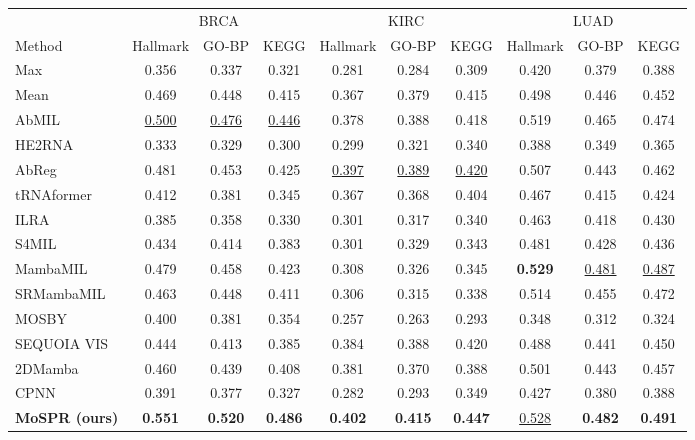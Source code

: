 \begin{tabular}{lccccccccc}
\toprule
& \multicolumn{3}{c}{BRCA} & \multicolumn{3}{c}{KIRC} & \multicolumn{3}{c}{LUAD}\\
\cmidrule(lr){2-4}\cmidrule(lr){5-7}\cmidrule(lr){8-10}
Method & Hallmark & GO-BP & KEGG & Hallmark & GO-BP & KEGG & Hallmark & GO-BP & KEGG\\
\midrule
Max~\citep{wang2018revisiting} & 0.356 & 0.337 & 0.321 & 0.281 & 0.284 & 0.309 & 0.420 & 0.379 & 0.388\\
Mean~\citep{wang2018revisiting} & 0.469 & 0.448 & 0.415 & 0.367 & 0.379 & 0.415 & 0.498 & 0.446 & 0.452\\
AbMIL~\citep{ilse2018abmil} & \underline{0.500} & \underline{0.476} & \underline{0.446} & 0.378 & 0.388 & 0.418 & 0.519 & 0.465 & 0.474\\
HE2RNA~\citep{schmauch2020he2rna} & 0.333 & 0.329 & 0.300 & 0.299 & 0.321 & 0.340 & 0.388 & 0.349 & 0.365\\
AbReg~\citep{graziani2022abreg} & 0.481 & 0.453 & 0.425 & \underline{0.397} & \underline{0.389} & \underline{0.420} & 0.507 & 0.443 & 0.462\\
tRNAformer~\citep{alsaafin2022trnaformer} & 0.412 & 0.381 & 0.345 & 0.367 & 0.368 & 0.404 & 0.467 & 0.415 & 0.424\\
ILRA~\citep{xiang2023ilra} & 0.385 & 0.358 & 0.330 & 0.301 & 0.317 & 0.340 & 0.463 & 0.418 & 0.430\\
S4MIL~\citep{fillioux2023s4mil} & 0.434 & 0.414 & 0.383 & 0.301 & 0.329 & 0.343 & 0.481 & 0.428 & 0.436\\
MambaMIL~\citep{yang2024mambamil} & 0.479 & 0.458 & 0.423 & 0.308 & 0.326 & 0.345 & \textbf{0.529} & \underline{0.481} & \underline{0.487}\\
SRMambaMIL~\citep{yang2024mambamil} & 0.463 & 0.448 & 0.411 & 0.306 & 0.315 & 0.338 & 0.514 & 0.455 & 0.472\\
MOSBY~\citep{senbabaoglu2024mosby} & 0.400 & 0.381 & 0.354 & 0.257 & 0.263 & 0.293 & 0.348 & 0.312 & 0.324\\
SEQUOIA VIS~\citep{pizurica2024sequoia} & 0.444 & 0.413 & 0.385 & 0.384 & 0.388 & 0.420 & 0.488 & 0.441 & 0.450\\
2DMamba~\citep{zhang2025twodmamba} & 0.460 & 0.439 & 0.408 & 0.381 & 0.370 & 0.388 & 0.501 & 0.443 & 0.457\\
CPNN~\citep{nishimura2026cpnn} & 0.391 & 0.377 & 0.327 & 0.282 & 0.293 & 0.349 & 0.427 & 0.380 & 0.388\\
\midrule
\textbf{MoSPR (ours)} & \textbf{0.551} & \textbf{0.520} & \textbf{0.486} & \textbf{0.402} & \textbf{0.415} & \textbf{0.447} & \underline{0.528} & \textbf{0.482} & \textbf{0.491}\\
\bottomrule
\end{tabular}